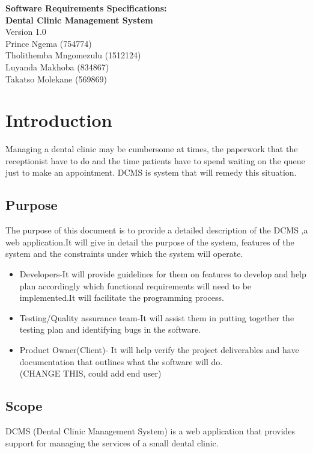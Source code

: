\documentclass[11 pt]{article}
\begin{document}
  
  \begin{titlepage}
\begin{center}
\huge{\bfseries{Software Requirements Specifications:}}\\
[2mm]
\huge{\bfseries{Dental Clinic Management System}}\\
Version 1.0\\
  \vskip 0.2in
 Prince Ngema (754774)\\
 Tholithemba Mngomezulu (1512124)\\
 Luyanda Makhoba (834867) \\
 Takatso Molekane (569869)\\
 
 

\end{center}
 \end{titlepage}
 \tableofcontents
 \newpage
\section{Introduction}\label{sec:intro}
Managing a dental clinic may be cumbersome at times, the paperwork that the receptionist have to do and the time  patients have to spend waiting on the queue just to make an appointment. DCMS is system that will remedy this situation.
\subsection{Purpose}
The purpose of this document is to provide a detailed description of the DCMS ,a web application.It will give in detail the purpose of the system, features of the system  and the constraints under which the system will operate.
 \begin{itemize}
\item
Developers-It will provide guidelines for them on features to develop and help plan accordingly which functional requirements will need to be implemented.It will facilitate the programming process.\\
\item
Testing/Quality assurance team-It will assist them in putting together the testing plan and identifying bugs in the software.\\
\item
Product Owner(Client)- It will help verify the project deliverables and have documentation that outlines what the software will do.\\(CHANGE THIS, could add end user)
\end{itemize}
\subsection{Scope}
DCMS (Dental Clinic Management System) is a web application that provides support for managing the services of a small dental clinic.
\end{document}

